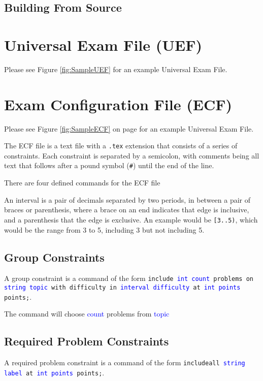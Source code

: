 \documentclass{article}
\begin{document}
\subsection{Building From Source}



\section{Universal Exam File (UEF)}

Please see Figure \ref{fig:SampleUEF} for an example Universal Exam File.

\section{Exam Configuration File (ECF)}
Please see Figure \ref{fig:SampleECF} on page \pageref{fig:SampleECF} for an example Universal Exam File.

The ECF file is a text file with a \texttt{.tex} extension that consists
of a series of constraints. Each constraint is separated by a semicolon,
with comments being all text that follows after a pound symbol 
(\texttt{\#}) until the end of the line.

There are four defined commands for the ECF file

An interval is a pair of decimals separated by two periods, in between a pair of braces or parenthesis, where a brace on an end indicates that edge is inclusive, and a parenthesis that the edge is exclusive. An example would be \texttt{[3..5)}, which would be the range from 3 to 5, including 3 but not including 5.

\subsection{Group Constraints}
A group constraint is a command of the form \texttt{include \textcolor{blue}{int count}
problems on \textcolor{blue}{string topic} with difficulty in \textcolor{blue}{interval difficulty} at \textcolor{blue}{int points} points;}.

The command will choose \textcolor{blue}{count} problems from \textcolor{blue}{topic} 

\subsection{Required Problem Constraints}
A required problem constraint is a command of the form \texttt{includeall \textcolor{blue}{string label} at \textcolor{blue}{int points} points;}.
\end{document}
